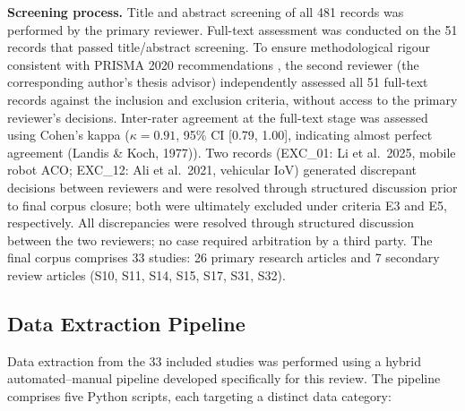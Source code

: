 \documentclass[review,3p,times]{elsarticle}
\begin{document}
\textbf{Screening process.} Title and abstract screening of all 481 records was performed by the primary reviewer. Full-text assessment was conducted on the 51 records that passed title/abstract screening. To ensure methodological rigour consistent with PRISMA 2020 recommendations \cite{page2021}, the second reviewer (the corresponding author's thesis advisor) independently assessed all 51 full-text records against the inclusion and exclusion criteria, without access to the primary reviewer's decisions. Inter-rater agreement at the full-text stage was assessed using Cohen's kappa ($\kappa=0.91$, 95\% CI [0.79, 1.00], indicating almost perfect agreement (Landis \& Koch, 1977)). Two records (EXC\_01: Li et al.\ 2025, mobile robot ACO; EXC\_12: Ali et al.\ 2021, vehicular IoV) generated discrepant decisions between reviewers and were resolved through structured discussion prior to final corpus closure; both were ultimately excluded under criteria E3 and E5, respectively. All discrepancies were resolved through structured discussion between the two reviewers; no case required arbitration by a third party. The final corpus comprises 33 studies: 26 primary research articles and 7 secondary review articles (S10, S11, S14, S15, S17, S31, S32).

\subsection{Data Extraction Pipeline}

Data extraction from the 33 included studies was performed using a hybrid automated--manual pipeline developed specifically for this review. The pipeline comprises five Python scripts, each targeting a distinct data category:
\end{document}
